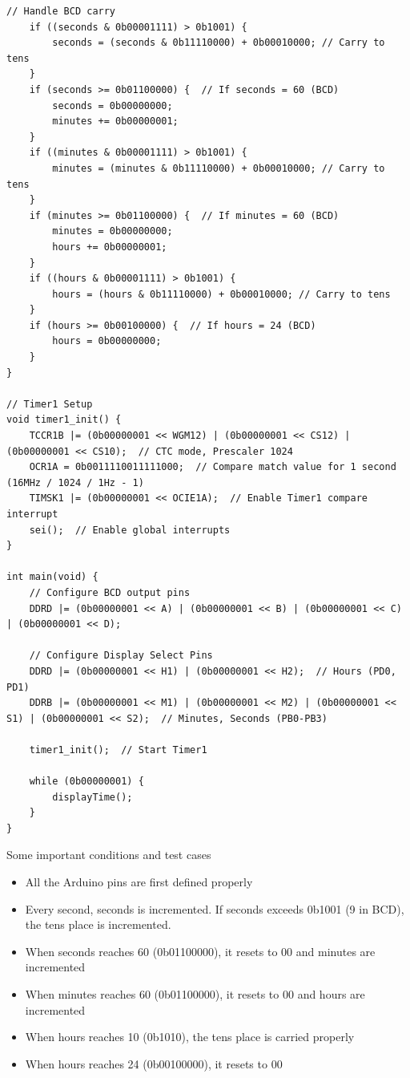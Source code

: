 \documentclass[journal]{IEEEtran}
\begin{document}
\begin{lstlisting}[style=customC]
    // Handle BCD carry
    if ((seconds & 0b00001111) > 0b1001) { 
        seconds = (seconds & 0b11110000) + 0b00010000; // Carry to tens
    }
    if (seconds >= 0b01100000) {  // If seconds = 60 (BCD)
        seconds = 0b00000000;
        minutes += 0b00000001;
    }
    if ((minutes & 0b00001111) > 0b1001) { 
        minutes = (minutes & 0b11110000) + 0b00010000; // Carry to tens
    }
    if (minutes >= 0b01100000) {  // If minutes = 60 (BCD)
        minutes = 0b00000000;
        hours += 0b00000001;
    }
    if ((hours & 0b00001111) > 0b1001) { 
        hours = (hours & 0b11110000) + 0b00010000; // Carry to tens
    }
    if (hours >= 0b00100000) {  // If hours = 24 (BCD)
        hours = 0b00000000;
    }
}

// Timer1 Setup
void timer1_init() {
    TCCR1B |= (0b00000001 << WGM12) | (0b00000001 << CS12) | (0b00000001 << CS10);  // CTC mode, Prescaler 1024
    OCR1A = 0b0011110011111000;  // Compare match value for 1 second (16MHz / 1024 / 1Hz - 1)
    TIMSK1 |= (0b00000001 << OCIE1A);  // Enable Timer1 compare interrupt
    sei();  // Enable global interrupts
}

int main(void) {
    // Configure BCD output pins
    DDRD |= (0b00000001 << A) | (0b00000001 << B) | (0b00000001 << C) | (0b00000001 << D);
    
    // Configure Display Select Pins
    DDRD |= (0b00000001 << H1) | (0b00000001 << H2);  // Hours (PD0, PD1)
    DDRB |= (0b00000001 << M1) | (0b00000001 << M2) | (0b00000001 << S1) | (0b00000001 << S2);  // Minutes, Seconds (PB0-PB3)

    timer1_init();  // Start Timer1

    while (0b00000001) {
        displayTime();
    }
}
\end{lstlisting}
Some important conditions and test cases 
\begin{itemize}
    \item All the Arduino pins are first defined properly 
    \item Every second, seconds is incremented.  If seconds exceeds 0b1001 (9 in BCD), the tens place is incremented.
    \item When seconds reaches 60 (0b01100000), it resets to 00 and minutes are incremented
    \item When minutes reaches 60 (0b01100000), it resets to 00 and hours are incremented
    \item When hours reaches 10 (0b1010), the tens place is carried properly
    \item When hours reaches 24 (0b00100000), it resets to 00 
\end{itemize}
\end{document}

